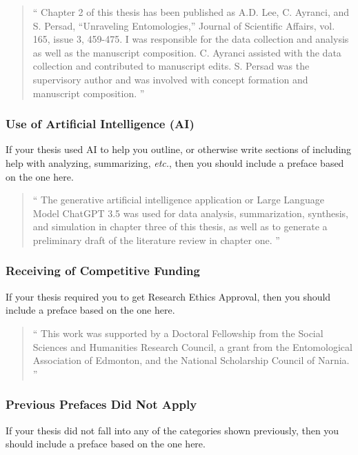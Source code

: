 				\begin{quote}
					\enquote{
						Chapter 2 of this thesis has been published as A.D. Lee, C. Ayranci, and S. Persad,  “Unraveling Entomologies,” Journal of Scientific Affairs, vol. 165, issue 3, 459-475. 
						I was responsible for the data collection and analysis as well as the manuscript composition. C. Ayranci assisted with the data collection and contributed to manuscript edits. S. Persad was the supervisory author and was involved with concept formation and manuscript composition.
					}
				\end{quote}

			\subsubsection{Use of Artificial Intelligence (AI)}
				If your thesis used AI to help you outline, or otherwise write sections of including help with analyzing, summarizing, \textit{etc.}, then you should include a preface based on the one here.

				\begin{quote}
					\enquote{
						The generative artificial intelligence application or Large Language Model ChatGPT 3.5 was used for data analysis, summarization, synthesis, and simulation in chapter three of this thesis, as well as to generate a preliminary draft of the literature review in chapter one. 
					}
				\end{quote}
				
			\subsubsection{Receiving of Competitive Funding}
				If your thesis required you to get Research Ethics Approval, then you should include a preface based on the one here.

				\begin{quote}
					\enquote{
						This work was supported by a Doctoral Fellowship from the Social Sciences and Humanities Research Council, a grant from the Entomological Association of Edmonton, and the National Scholarship Council of Narnia. 
					}
				\end{quote}
				
			\subsubsection{Previous Prefaces Did Not Apply}\label{sssec:preface}
				If your thesis did not fall into any of the categories shown previously, then you should include a preface based on the one here.

